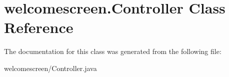 \hypertarget{classwelcomescreen_1_1_controller}{}\section{welcomescreen.\+Controller Class Reference}
\label{classwelcomescreen_1_1_controller}


The documentation for this class was generated from the following file\+:\begin{DoxyCompactItemize}
\item 
welcomescreen/Controller.\+java\end{DoxyCompactItemize}
